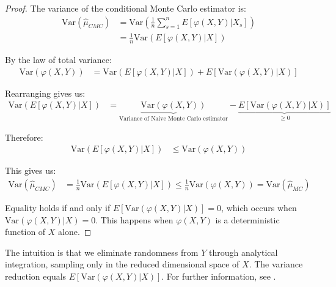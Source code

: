 \begin{proof}
The variance of the conditional Monte Carlo estimator is:
\begin{align*}
\text{Var}(\hat{\mu}_{CMC}) &= \text{Var}\left(\frac{1}{n}\sum_{s=1}^n E[\varphi(X,Y)|X_s]\right)\\
&= \frac{1}{n}\text{Var}(E[\varphi(X,Y)|X])
\end{align*}

By the law of total variance:
\begin{align*}
\text{Var}(\varphi(X,Y)) &= \text{Var}(E[\varphi(X,Y)|X]) + E[\text{Var}(\varphi(X,Y)|X)]
\end{align*}

Rearranging gives us:
\begin{align*}
\text{Var}(E[\varphi(X,Y)|X]) &= \underbrace{\text{Var}(\varphi(X,Y))}_{\text{Variance of Naive Monte Carlo estimator}} - 
\underbrace{E[\text{Var}(\varphi(X,Y)|X)]}_{\geq 0} 
\end{align*}

Therefore:
\begin{align*}
\text{Var}(E[\varphi(X,Y)|X]) &\leq \text{Var}(\varphi(X,Y))
\end{align*}

This gives us:
\begin{align*}
\text{Var}(\hat{\mu}_{CMC}) &= \frac{1}{n}\text{Var}(E[\varphi(X,Y)|X]) \leq \frac{1}{n}\text{Var}(\varphi(X,Y)) = \text{Var}(\hat{\mu}_{MC})
\end{align*}

Equality holds if and only if $E[\text{Var}(\varphi(X,Y)|X)] = 0$, which occurs when $\text{Var}(\varphi(X,Y)|X) = 0$. This happens when $\varphi(X,Y)$ is a deterministic function of $X$ alone.
\end{proof}

The intuition is that we eliminate randomness from $Y$ through analytical integration, sampling only in the reduced dimensional space of $X$. The variance reduction equals $E[\text{Var}(\varphi(X,Y)|X)]$. For further information, see \cite{murphy_probabilistic_2023, lemieux_monte_2009}.